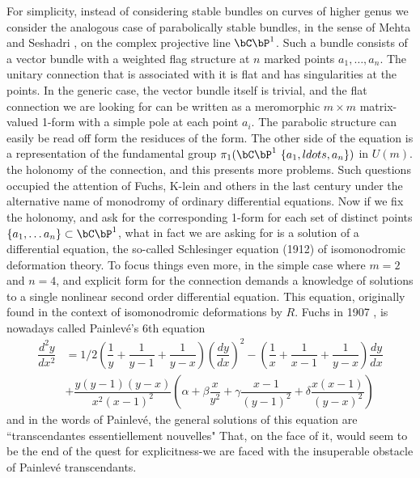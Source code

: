 For simplicity, instead of considering stable bundles on curves of higher genus we consider the analogous case of parabolically stable bundles, in the sense of Mehta and Seshadri \cite{art7-key11}, on the complex projective line $\bC\bP^{1}$. Such a bundle consists of a vector bundle with a weighted flag structure at $n$ marked points
$a_{1}, \ldots, a_{n}$. The unitary connection that is associated with it is flat and has singularities at the points. In the generic case, the vector bundle itself is trivial, and the flat connection we are looking for can be written as a meromorphic $m \times m$ matrix-valued 1-form with a simple pole at each point $a_{i}$. The parabolic structure can easily be read off form the residuces of the form. The other side of the equation is a representation of the fundamental group $\pi_{1}(\bC\bP^{1}\ \{a_{1}, ldots, a_{n}\})$ in $U(m)$. the holonomy of the connection, and this presents more problems. Such questions occupied the attention of Fuchs, K-lein and others in the last century under the alternative name of monodromy of ordinary differential equations. Now if we fix the holonomy, and ask for the corresponding 1-form for each set of distinct points $\{a_{1}, \ldots a_{n}\}\subset \bC\bP^{1}$, what in fact we are asking for is a solution of a differential equation, the so-called Schlesinger equation (1912) of isomonodromic deformation theory. To focus things even more, in the simple case where $m=2$ and $n =4$, and explicit form for the connection demands a knowledge of solutions to a single nonlinear second order differential equation. This equation, originally found in the context of isomonodromic deformations by $R$. Fuchs in 1907 \cite{art7-key4}, is nowadays called Painlev\'e's 6th equation
\begin{equation*}
\begin{split}
\dfrac{d^{2}y}{dx^{2}} & = 1/2 \left(\dfrac{1}{y} + \dfrac{1}{y-1} + \dfrac{1}{y-x}\right)\left(\dfrac{dy}{dx}\right)^{2} - \left(\dfrac{1}{x} + \dfrac{1}{x-1} + \dfrac{1}{y-x}\right) \dfrac{dy}{dx} \\
 &+ \dfrac{y(y-1)(y-x)}{x^{2}(x-1)^{2}} \left(\alpha + \beta\dfrac{x}{y^{2}} + \gamma\dfrac{x-1}{(y-1)^{2}} + \delta\dfrac{x(x-1)}{(y-x)^{2}}\right)
\end{split}
\end{equation*}
and in the words of Painlev\'e, the general solutions of this equation are ``transcendantes essentiellement nouvelles"  That, on the face of it, would seem to be the end of the quest for explicitness-we are faced with the insuperable obstacle of Painlev\'e transcendants.

